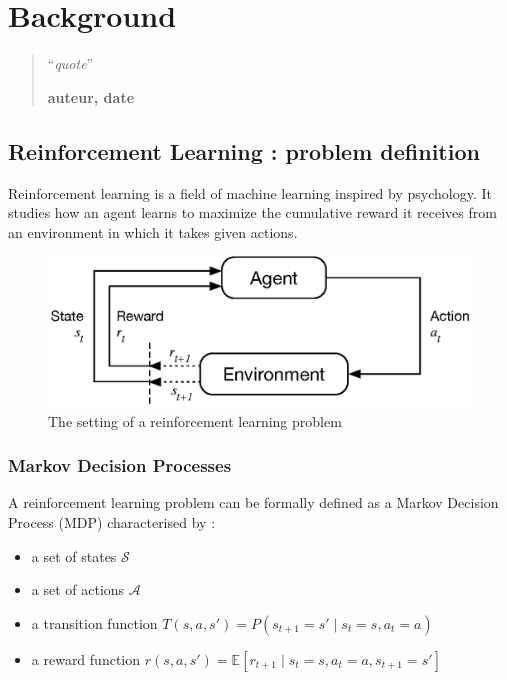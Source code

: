 \chapter{Background}
\begin{quotation}
\noindent ``\emph{quote}''
\begin{flushright}\textbf{auteur, date}\end{flushright}
\end{quotation}

\vspace*{0.5cm}

\section{Reinforcement Learning : problem definition}
Reinforcement learning is a field of machine learning inspired by psychology.
It studies how an agent learns to maximize the cumulative reward it receives
from an environment in which it takes given actions.\\

\begin{figure}[]
	\centering
	\includegraphics[width=0.65\linewidth]{fig/rl.eps}
	\caption{The setting of a reinforcement learning problem 
		\cite{suttonbarto}}
	\label{fig:rl}
\end{figure}

\subsection{Markov Decision Processes}
A reinforcement learning problem can be formally defined as a Markov 
Decision Process (MDP)  characterised by :
\begin{itemize}
	\item a set of states $\mathcal{S}$
	\item a set of actions $\mathcal{A}$
	\item a transition function 
		$T(s, a, s') = P(s_{t+1} = s' \mid s_t = s, a_t = a)$
	\item a reward function 
		$r(s, a, s') = \mathbb{E}
		 [r_{t+1} \mid s_t = s, a_t = a, s_{t+1} = s']$
\end{itemize}

